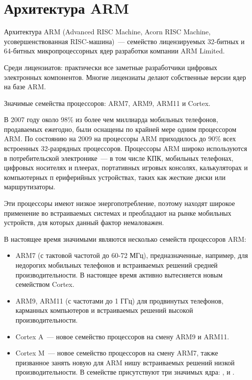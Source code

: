 \chapter{Архитектура ARM}


Архитектура ARM (Advanced RISC Machine, Acorn RISC Machine, 
усовершенствованная RISC-машина)\ --- семейство лицензируемых 32-битных и 
64-битных микропроцессорных ядер разработки компании ARM Limited.

Среди лицензиатов: практически все заметные разработчики цифровых
электронных компонентов.
Многие лицензиаты делают собственные версии ядер на базе ARM.

Значимые семейства процессоров: ARM7, ARM9, ARM11 и Cortex.

В 2007 году около 98\% из более чем миллиарда мобильных телефонов, продаваемых 
ежегодно, были оснащены по крайней мере одним процессором ARM. По состоянию 
на 2009 на процессоры ARM приходилось до 90\% всех встроенных 32-разрядных 
процессоров. Процессоры ARM широко используются в потребительской 
электронике\ --- в том числе КПК, мобильных телефонах, цифровых носителях и 
плеерах, портативных игровых консолях, калькуляторах и компьютерных п
ериферийных устройствах, таких как жесткие диски или маршрутизаторы.

Эти процессоры имеют низкое энергопотребление, поэтому находят широкое 
применение во встраиваемых системах и преобладают на рынке мобильных 
устройств, для которых данный фактор немаловажен.

В настоящее время значимыми являются несколько семейств процессоров ARM:

\begin{itemize}
\item ARM7 (с тактовой частотой до 60-72 МГц), предназначенные, например, для 
недорогих мобильных телефонов и встраиваемых решений средней производительности. 
В настоящее время активно вытесняется новым семейством Cortex.
\item ARM9, ARM11 (с частотами до 1 ГГц) для продвинутых телефонов, карманных 
компьютеров и встраиваемых решений высокой производительности.
\item Cortex A\ --- новое семейство процессоров на смену ARM9 и ARM11.
\item Cortex M\ --- новое семейство процессоров на смену ARM7, также 
призванное занять новую для ARM нишу встраиваемых решений низкой 
производительности. В семействе присутствуют три значимых ядра: , 
 и .
\end{itemize}

